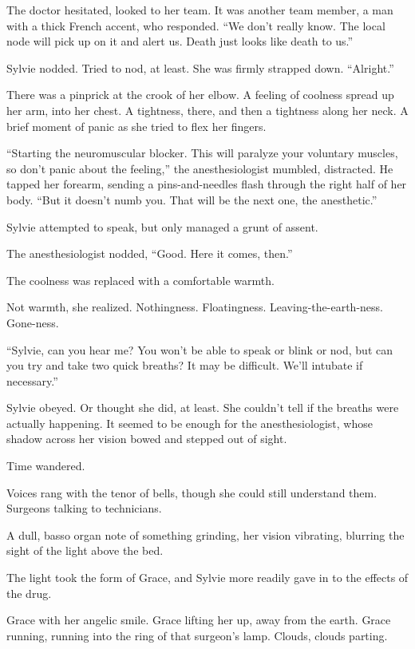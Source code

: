 \documentclass[12pt,letterpaper,oneside]{memoir}
\begin{document}
  The doctor hesitated, looked to her team. It was another team member, a
  man with a thick French accent, who responded. ``We don't really know.
  The local node will pick up on it and alert us. Death just looks like
  death to us.''

  Sylvie nodded. Tried to nod, at least. She was firmly strapped down.
  ``Alright.''

  There was a pinprick at the crook of her elbow. A feeling of coolness
  spread up her arm, into her chest. A tightness, there, and then a
  tightness along her neck. A brief moment of panic as she tried to flex
  her fingers.

  ``Starting the neuromuscular blocker. This will paralyze your voluntary
  muscles, so don't panic about the feeling,'' the anesthesiologist
  mumbled, distracted. He tapped her forearm, sending a pins-and-needles
  flash through the right half of her body. ``But it doesn't numb you.
  That will be the next one, the anesthetic.''

  Sylvie attempted to speak, but only managed a grunt of assent.

  The anesthesiologist nodded, ``Good. Here it comes, then.''

  The coolness was replaced with a comfortable warmth.

  Not warmth, she realized. Nothingness. Floatingness.
  Leaving-the-earth-ness. Gone-ness.

  ``Sylvie, can you hear me? You won't be able to speak or blink or nod,
  but can you try and take two quick breaths? It may be difficult. We'll
  intubate if necessary.''

  Sylvie obeyed. Or thought she did, at least. She couldn't tell if the
  breaths were actually happening. It seemed to be enough for the
  anesthesiologist, whose shadow across her vision bowed and stepped out
  of sight.

  Time wandered.

  Voices rang with the tenor of bells, though she could still understand
  them. Surgeons talking to technicians.

  A dull, basso organ note of something grinding, her vision vibrating,
  blurring the sight of the light above the bed.

  The light took the form of Grace, and Sylvie more readily gave in to the
  effects of the drug.

  Grace with her angelic smile. Grace lifting her up, away from the earth.
  Grace running, running into the ring of that surgeon's lamp. Clouds,
  clouds parting.
\end{document}
